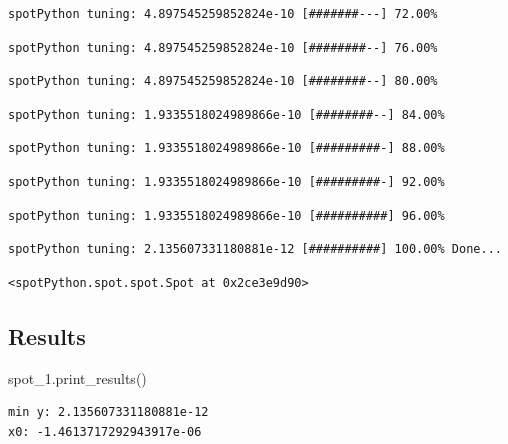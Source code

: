 \documentclass[
  letterpaper,
  DIV=11,
  numbers=noendperiod]{scrreprt}
\newenvironment{Shaded}{\begin{snugshade}}{\end{snugshade}}
\newcommand{\NormalTok}[1]{\textcolor[rgb]{0.00,0.23,0.31}{#1}}
\begin{document}
\begin{verbatim}
spotPython tuning: 4.897545259852824e-10 [#######---] 72.00% 
\end{verbatim}

\begin{verbatim}
spotPython tuning: 4.897545259852824e-10 [########--] 76.00% 
\end{verbatim}

\begin{verbatim}
spotPython tuning: 4.897545259852824e-10 [########--] 80.00% 
\end{verbatim}

\begin{verbatim}
spotPython tuning: 1.9335518024989866e-10 [########--] 84.00% 
\end{verbatim}

\begin{verbatim}
spotPython tuning: 1.9335518024989866e-10 [#########-] 88.00% 
\end{verbatim}

\begin{verbatim}
spotPython tuning: 1.9335518024989866e-10 [#########-] 92.00% 
\end{verbatim}

\begin{verbatim}
spotPython tuning: 1.9335518024989866e-10 [##########] 96.00% 
\end{verbatim}

\begin{verbatim}
spotPython tuning: 2.135607331180881e-12 [##########] 100.00% Done...
\end{verbatim}

\begin{verbatim}
<spotPython.spot.spot.Spot at 0x2ce3e9d90>
\end{verbatim}

\hypertarget{results-3}{%
\subsection{Results}\label{results-3}}

\begin{Shaded}
\begin{Highlighting}[]
\NormalTok{spot\_1.print\_results()}
\end{Highlighting}
\end{Shaded}

\begin{verbatim}
min y: 2.135607331180881e-12
x0: -1.4613717292943917e-06
\end{verbatim}
\end{document}
